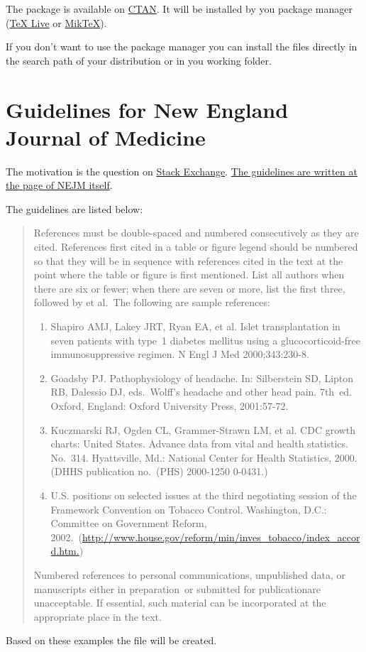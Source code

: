 \documentclass[english]{ltxdockit}
\begin{document}
The package is available on \href{http://www.ctan.org}{CTAN}. It will be installed by you package manager (\href{http://www.tug.org/texlive}{TeX Live} or \href{http://www.miktex.org}{MikTeX}).

If you don't want to use the package manager you can install the files directly in the search path of your distribution or in you working folder.

\section[Guidelines for NEJM]{Guidelines for  New England Journal of Medicine}
\label{guidlines}
The motivation is the question on \href{http://tex.stackexchange.com/questions/26891/biblatex-style-file-for-new-england-journal-of-medicine-nejm/26894#26894}{Stack Exchange}. \href{http://www.nejm.org/page/author-center/manuscript-submission}{The guidelines are written at the page of NEJM itself}.

The guidelines are listed below:
\begin{quote}
References must be double-spaced and numbered consecutively as they are cited. References first cited in a table or figure legend should be numbered so that they will be in sequence with references cited in the text at the point where the table or figure is first mentioned. List all authors when there are six or fewer; when there are seven or more, list the first three, followed by \glqq et al.\grqq\ The following are sample references:
\begin{enumerate}
 \frenchspacing
 \item    Shapiro AMJ, Lakey JRT, Ryan EA, et al. Islet transplantation in seven patients with type~1
          diabetes mellitus using a glucocorticoid-free immunosuppressive regimen. N Engl J Med
          2000;343:230-8.
 \item    Goadsby PJ. Pathophysiology of headache. In: Silberstein SD, Lipton RB, Dalessio DJ, eds.\
          Wolff's headache and other head pain. 7th~ed. Oxford, England: Oxford University Press,
          2001:57-72.
 \item    Kuczmarski RJ, Ogden CL, Grammer-Strawn LM, et al. CDC growth charts: United States. Advance
          data from vital and health statistics. No.~314. Hyattsville, Md.: National Center for Health
          Statistics, 2000. (DHHS publication no.~(PHS) 2000-1250 0-0431.)
 \item    U.S. positions on selected issues at the third negotiating session of the Framework Convention
          on Tobacco Control. Washington, D.C.: Committee on Government Reform, 2002.\
          (\url{http://www.house.gov/reform/min/inves_tobacco/index_accord.htm.})
\end{enumerate}
Numbered references to personal communications, unpublished data, or manuscripts either \glqq in preparation\grqq\ or \glqq submitted for publication\grqq are unacceptable. If essential, such material can be incorporated at the appropriate place in the text.
\end{quote}
Based on these examples the \file{bib} file will be created.
\end{document}
